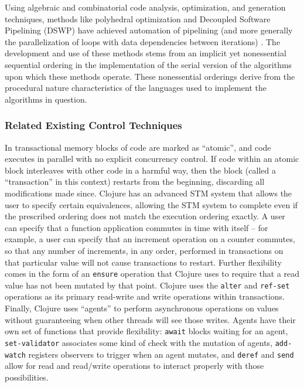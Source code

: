 \documentclass[pageno]{jpaper}
\begin{document}
Using algebraic and combinatorial code analysis, optimization, and generation
techniques, methods like polyhedral optimization and Decoupled Software
Pipelining (DSWP) have achieved automation of pipelining (and more generally the
parallelization of loops with data dependencies between iterations)
\cite{polyopt} \cite{dswp}. The development and use of these methods stems from
an implicit yet nonessential sequential ordering in the implementation of the
serial version of the algorithms upon which these methods operate. These
nonessential orderings derive from the procedural nature characteristics of the
languages used to implement the algorithms in question.

\subsubsection{Related Existing Control Techniques}
In transactional memory blocks of code are
marked as ``atomic'', and code executes in parallel with no explicit concurrency
control. If code within an atomic block interleaves with other code in a harmful
way, then the block (called a ``transaction'' in this context) restarts from the
beginning, discarding all modifications made since. Clojure has an advanced STM
system that allows the user to specify certain equivalences, allowing the STM
system to complete even if the prescribed ordering does not match the execution
ordering exactly. A user can specify that a function application commutes in time
with itself -- for example, a user can specify that an increment operation on a
counter commutes, so that any number of increments, in any order, performed in
transactions on that particular value will not cause transactions to restart. Further
flexibility comes in the form of an \texttt{ensure} operation that Clojure uses to
require that a read value has not been mutated by that point. Clojure uses the
\texttt{alter} and \texttt{ref-set} operations as its primary read-write and write
operations within transactions. Finally, Clojure uses ``agents'' to perform
asynchronous operations on values without guaranteeing when other threads will
see those writes. Agents have their own set of functions that provide
flexibility: \texttt{await} blocks waiting for an agent, \texttt{set-validator}
associates some kind of check with the mutation of agents, \texttt{add-watch}
registers observers to trigger when an agent mutates, and \texttt{deref} and
\texttt{send} allow for read and read/write operations to interact properly with
those possibilities.
\end{document}
